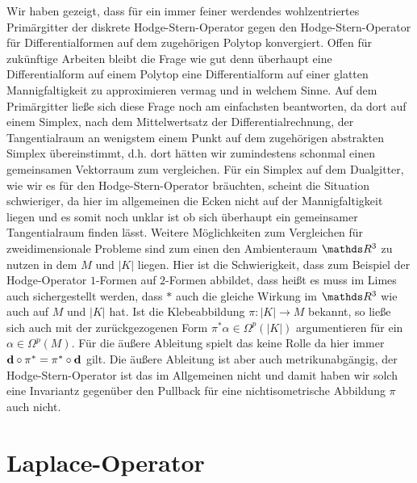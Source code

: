 \begin{fazit}
    Wir haben gezeigt, dass für ein immer feiner werdendes wohlzentriertes Primärgitter der diskrete Hodge-Stern-Operator gegen den Hodge-Stern-Operator für Differentialformen auf dem
    zugehörigen Polytop konvergiert.
    Offen für zukünftige Arbeiten bleibt die Frage wie gut denn überhaupt eine Differentialform auf einem Polytop eine Differentialform auf einer glatten Mannigfaltigkeit zu approximieren vermag
    und in welchem Sinne.
    Auf dem Primärgitter ließe sich diese Frage noch am einfachsten beantworten, da dort auf einem Simplex, nach dem Mittelwertsatz der Differentialrechnung, der Tangentialraum an
    wenigstem einem Punkt auf dem zugehörigen abstrakten Simplex übereinstimmt, d.h. dort hätten wir zumindestens schonmal einen gemeinsamen Vektorraum zum vergleichen.
    Für ein Simplex auf dem Dualgitter, wie wir es für den Hodge-Stern-Operator bräuchten, scheint die Situation schwieriger, da hier im allgemeinen die Ecken nicht auf der Mannigfaltigkeit
    liegen und es somit noch unklar ist ob sich überhaupt ein gemeinsamer Tangentialraum finden lässt.
    Weitere Möglichkeiten zum Vergleichen für zweidimensionale Probleme sind zum einen den Ambienteraum \( \R^{3} \) zu nutzen in dem \( M \) und \( |K| \) liegen.
    Hier ist die Schwierigkeit, dass zum Beispiel der Hodge-Operator \( 1 \)-Formen auf \( 2 \)-Formen abbildet, dass heißt es muss im Limes auch sichergestellt werden, dass \( * \) auch
    die gleiche Wirkung im \( \R^{3} \) wie auch auf \( M \) und \( |K| \) hat.
    Ist die Klebeabbildung \( \pi:|K|\rightarrow M \) bekannt, so ließe sich auch mit der zurückgezogenen Form \( \pi^{*}\alpha\in\Omega^{p}(|K|) \) argumentieren für ein \(
    \alpha\in\Omega^{p}(M) \).
    Für die äußere Ableitung spielt das keine Rolle da hier immer \( \mathbf{d}\circ\pi^{*} = \pi^{*}\circ\mathbf{d} \) gilt.
    Die äußere Ableitung ist aber auch metrikunabgängig, der Hodge-Stern-Operator ist das im Allgemeinen nicht und damit haben wir solch eine Invariantz gegenüber den Pullback für eine 
    nichtisometrische Abbildung \( \pi \) auch nicht.
  \end{fazit}




\section{Laplace-Operator}
  
